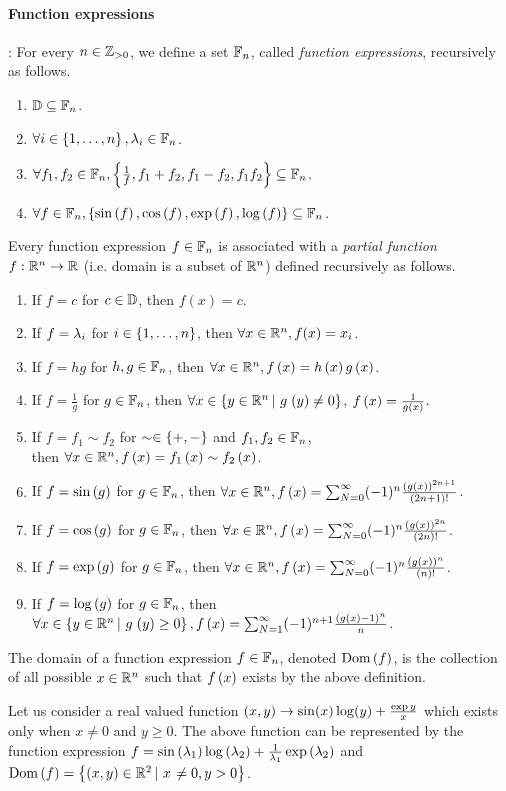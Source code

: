 \paragraph{Function expressions}:  For every $n\in\mathbb{Z}_{>0}$, we
define a set $\mathbb{F}_{n}$, called \emph{function expressions}, recursively
as follows.
%
\begin{enumerate}
\item $\mathbb{D}\subseteq \mathbb{F}_{n}$.
\item $\forall i\in\left\{1,\ldots,n\right\}, \lambda_{i}\in\mathbb{F}_{n}$.
\item $\forall f_1,f_2\in\mathbb{F}_{n}, \left\{ \frac{1}{f}, f_1+f_2, f_1-f_2, f_1f_2\right\}\subseteq\mathbb{F}_{n}$.
\item $\forall f\in\mathbb{F}_{n}, \left\{ \sin\left(f\right), \cos\left(f\right), \exp\left(f\right), \log\left(f\right) \right\} \subseteq \mathbb{F}_{n}$.
\end{enumerate}
%
Every function expression $f\in\mathbb{F}_{n}$ is associated with a \emph{partial
function}
$f:\mathbb{R}^n\rightarrow\mathbb{R}$ (i.e. domain is a subset of $\mathbb{R}^n$)
defined recursively as follows.
\begin{enumerate}
\item If $f = c$ for $c\in\mathbb{D}$, then $f(x) = c$.
\item If $f = \lambda_{i}$ for $i\in\left\{1,\ldots,n\right\}$, then $\forall
x\in\mathbb{R}^n, f(x) = x_i$.
\item If $f = hg$ for $h,g\in\mathbb{F}_{n}$, then $\forall x\in \mathbb{R}^n, f\left(x\right) =
h\left(x\right)g\left(x\right)$.
\item If $f = \frac{1}{g}$ for $g\in\mathbb{F}_{n}$, then $\forall
x \in\left\{y\in\mathbb{R}^n\left|~g\right.\left(y\right)\neq 0\right\}$, $f\left(x\right)
= \frac{1}{g\left(x\right)}$.
\item If $f = f_1\sim f_2$ for $\sim\in\left\{+,-\right\}$ and
$f_1,f_2\in\mathbb{F}_{n}$,\\ then $\forall x\in \mathbb{R}^n, f\left(x\right) = f_1\left(x\right)\sim f_2\left(x\right)$.
\item If $f = \sin\left(g\right)$ for $g\in\mathbb{F}_{n}$, then $\forall x\in \mathbb{R}^n, f\left(x\right) = \sum_{N=0}^\infty(-1)^n\frac{\left(g\left(x\right)\right)^{2n+1}}{\left(2n+1\right)!}$.
\item If $f = \cos\left(g\right)$ for $g\in\mathbb{F}_{n}$, then $\forall x\in \mathbb{R}^n, f\left(x\right)
= \sum_{N=0}^\infty (-1)^n\frac{\left(g\left(x\right)\right)^{2n}}{\left(2n\right)!}$.
\item If $f = \exp\left(g\right)$ for $g\in\mathbb{F}_{n}$, then $\forall x\in \mathbb{R}^n, f\left(x\right)
= \sum_{N=0}^\infty(-1)^n\frac{\left(g\left(x\right)\right)^{n}}{\left(n\right)!}$.
\item If $f = \log\left(g\right)$ for $g\in\mathbb{F}_{n}$, then\\ $\forall
x \in\left\{y\in\mathbb{R}^n\left|~g\right.\left(y\right)\geq 0\right\}, f\left(x\right)
= \sum_{N=1}^\infty(-1)^{n+1}\frac{\left(g\left(x\right)-1\right)^{n}}{n}$.
\end{enumerate}
%
The domain of a function expression $f\in\mathbb{F}_{n}$, denoted $\operatorname{Dom}\left(f\right)$, is the collection of
all possible $x\in\mathbb{R}^n$ such that $f\left(x\right)$ exists by the above
definition.
%
\begin{example}
Let us consider a real valued function
$\left(x,y\right)\rightarrow \sin(x)\log(y) + \frac{\exp{y}}{x}$ which exists
only when $x\neq 0$ and $y\geq 0$.  The above function can be
represented by the function expression
$f = \sin\left(\lambda_{1}\right)\log\left(\lambda_{2}\right) + \frac{1}{\lambda_{1}}\exp\left(\lambda_{2}\right)$
and $\operatorname{Dom}\left(f\right) = \left\{(x,y)\in\mathbb{R}^2\left|~x\right.\neq 0, y>0\right\}$.
\end{example}
%
